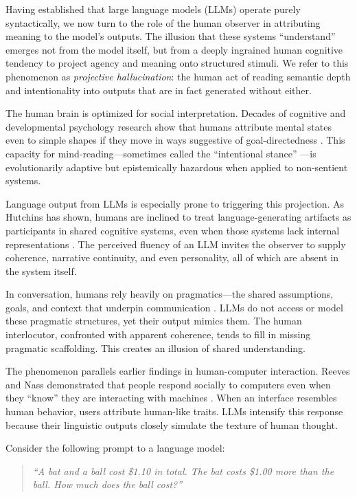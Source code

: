 \documentclass[12pt]{article}
\theoremstyle{plain}
\theoremstyle{definition}
\theoremstyle{remark}
\begin{document}
Having established that large language models (LLMs) operate purely syntactically, we now turn to the role of the human observer in attributing meaning to the model's outputs. The illusion that these systems “understand” emerges not from the model itself, but from a deeply ingrained human cognitive tendency to project agency and meaning onto structured stimuli. We refer to this phenomenon as \textit{projective hallucination}: the human act of reading semantic depth and intentionality into outputs that are in fact generated without either.

The human brain is optimized for social interpretation. Decades of cognitive and developmental psychology research show that humans attribute mental states even to simple shapes if they move in ways suggestive of goal-directedness \parencite{heider1944experimental}. This capacity for mind-reading—sometimes called the “intentional stance” \parencite{dennett1989intentional}—is evolutionarily adaptive but epistemically hazardous when applied to non-sentient systems.

Language output from LLMs is especially prone to triggering this projection. As Hutchins has shown, humans are inclined to treat language-generating artifacts as participants in shared cognitive systems, even when those systems lack internal representations \parencite{hutchins1996cognition}. The perceived fluency of an LLM invites the observer to supply coherence, narrative continuity, and even personality, all of which are absent in the system itself.

In conversation, humans rely heavily on pragmatics—the shared assumptions, goals, and context that underpin communication \parencite{grice1975logic}. LLMs do not access or model these pragmatic structures, yet their output mimics them. The human interlocutor, confronted with apparent coherence, tends to fill in missing pragmatic scaffolding. This creates an illusion of shared understanding.

The phenomenon parallels earlier findings in human-computer interaction. Reeves and Nass demonstrated that people respond socially to computers even when they “know” they are interacting with machines \parencite{reeves2003media}. When an interface resembles human behavior, users attribute human-like traits. LLMs intensify this response because their linguistic outputs closely simulate the texture of human thought.

Consider the following prompt to a language model:

\begin{quote}
    \textit{“A bat and a ball cost \$1.10 in total. The bat costs \$1.00 more than the ball. How much does the ball cost?”}
\end{quote}
\end{document}
